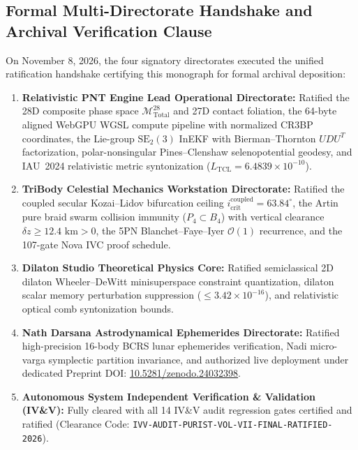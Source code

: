 \documentclass[11pt,a4paper,reqno]{article}
\theoremstyle{plain}
\theoremstyle{definition}
\theoremstyle{remark}
\numberwithin{equation}{section}
\numberwithin{table}{section}
\newcommand{\Mtotal}{\mathcal{M}_{\mathrm{Total}}^{28}}
\begin{document}
\subsection{Formal Multi-Directorate Handshake and Archival Verification Clause}
On November 8, 2026, the four signatory directorates executed the unified ratification handshake certifying this monograph for formal archival deposition:
\begin{enumerate}[label=\textbf{(\arabic*)}, leftmargin=2.0em]
  \item \textbf{Relativistic PNT Engine Lead Operational Directorate:} Ratified the 28D composite phase space $\Mtotal$ and 27D contact foliation, the 64-byte aligned WebGPU WGSL compute pipeline with normalized CR3BP coordinates, the Lie-group $\mathrm{SE}_2(3)$ InEKF with Bierman--Thornton $UDU^T$ factorization, polar-nonsingular Pines--Clenshaw selenopotential geodesy, and IAU~2024 relativistic metric syntonization ($L_{\mathrm{TCL}} = 6.4839 \times 10^{-10}$).
  \item \textbf{TriBody Celestial Mechanics Workstation Directorate:} Ratified the coupled secular Kozai--Lidov bifurcation ceiling $i_{\mathrm{crit}}^{\mathrm{coupled}} = 63.84^\circ$, the Artin pure braid swarm collision immunity ($P_4 \subset B_4$) with vertical clearance $\delta z \ge 12.4\text{ km} > 0$, the 5PN Blanchet--Faye--Iyer $\mathcal{O}(1)$ recurrence, and the 107-gate Nova IVC proof schedule.
  \item \textbf{Dilaton Studio Theoretical Physics Core:} Ratified semiclassical 2D dilaton Wheeler--DeWitt minisuperspace constraint quantization, dilaton scalar memory perturbation suppression ($\le 3.42 \times 10^{-16}$), and relativistic optical comb syntonization bounds.
  \item \textbf{Nath Darsana Astrodynamical Ephemerides Directorate:} Ratified high-precision 16-body BCRS lunar ephemerides verification, Nadi micro-varga symplectic partition invariance, and authorized live deployment under dedicated Preprint DOI: \href{https://doi.org/10.5281/zenodo.24032398}{10.5281/zenodo.24032398}.
  \item {\raggedright
  \textbf{Autonomous System Independent Verification \& Validation (IV\&V):} Fully cleared with all 14 IV\&V audit regression gates certified and ratified (Clearance Code: \texttt{IVV-AUDIT-PURIST-VOL-VII-FINAL-RATIFIED-2026}).\par}
\end{enumerate}
\end{document}
